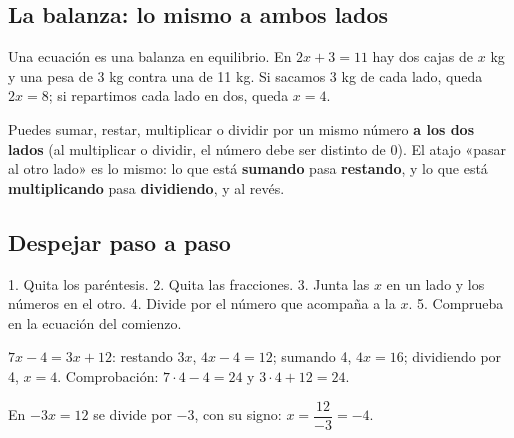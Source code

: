 \subsection{La balanza: lo mismo a ambos lados}
\begin{minipage}[c]{0.56\linewidth}
Una ecuación es una balanza en equilibrio. En $2x + 3 = 11$ hay dos cajas de $x$ kg y una pesa de 3 kg contra una de 11 kg. Si sacamos 3 kg de cada lado, queda $2x = 8$; si repartimos cada lado en dos, queda $x = 4$.
\end{minipage}\hfill
\begin{minipage}[c]{0.4\linewidth}\centering
{}
\end{minipage}

\begin{clave} Puedes sumar, restar, multiplicar o dividir por un mismo número \textbf{a los dos lados} (al multiplicar o dividir, el número debe ser distinto de 0). El atajo «pasar al otro lado» es lo mismo: lo que está \textbf{sumando} pasa \textbf{restando}, y lo que está \textbf{multiplicando} pasa \textbf{dividiendo}, y al revés.\end{clave}

\subsection{Despejar paso a paso}
\begin{clave} 1. Quita los paréntesis. 2. Quita las fracciones. 3. Junta las $x$ en un lado y los números en el otro. 4. Divide por el número que acompaña a la $x$. 5. Comprueba en la ecuación del comienzo.\end{clave}
\begin{ejemplo} $7x - 4 = 3x + 12$: restando $3x$, $4x - 4 = 12$; sumando 4, $4x = 16$; dividiendo por 4, $x = 4$. Comprobación: $7\cdot 4 - 4 = 24$ y $3\cdot 4 + 12 = 24$.\end{ejemplo}
\begin{ojo} En $-3x = 12$ se divide por $-3$, con su signo: $x = \dfrac{12}{-3} = -4$.\end{ojo}

